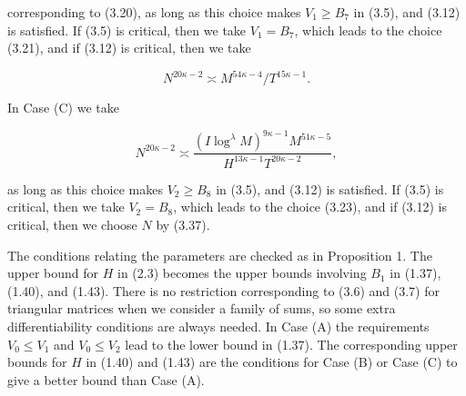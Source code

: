 \documentclass[10pt]{article}
\begin{document}
corresponding to (3.20), as long as this choice makes $V_{1} \geqslant B_{7}$ in (3.5), and (3.12) is satisfied. If (3.5) is critical, then we take $V_{1}=B_{7}$, which leads to the choice (3.21), and if (3.12) is critical, then we take


\begin{equation*}
N^{20 \kappa-2} \asymp M^{54 \kappa-4} / T^{15 \kappa-1}. \tag{3.37}
\end{equation*}


In Case (C) we take


\begin{equation*}
N^{20 \kappa-2} \asymp \frac{\left(I \log ^{\lambda} M\right)^{9 \kappa-1} M^{51 \kappa-5}}{H^{13 \kappa-1} T^{20 \kappa-2}}, \tag{3.38}
\end{equation*}


as long as this choice makes $V_{2} \geqslant B_{8}$ in (3.5), and (3.12) is satisfied. If (3.5) is critical, then we take $V_{2}=B_{8}$, which leads to the choice (3.23), and if (3.12) is critical, then we choose $N$ by (3.37).

The conditions relating the parameters are checked as in Proposition 1. The upper bound for $H$ in (2.3) becomes the upper bounds involving $B_{1}$ in (1.37), (1.40), and (1.43). There is no restriction corresponding to (3.6) and (3.7) for triangular matrices when we consider a family of sums, so some extra differentiability conditions are always needed. In Case (A) the requirements $V_{0} \leqslant V_{1}$ and $V_{0} \leqslant V_{2}$ lead to the lower bound in (1.37). The corresponding upper bounds for $H$ in (1.40) and (1.43) are the conditions for Case (B) or Case (C) to give a better bound than Case (A).
\end{document}
